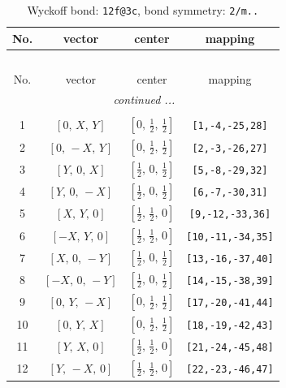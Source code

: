 \documentclass[fleqn,8pt]{jsarticle}
\begin{document}
\renewcommand{\arraystretch}{1.2}
\begin{longtable}{cccc}
\caption{Wyckoff bond: {\tt 12f@3c}, bond symmetry: {\tt 2/m..}}
 \\
 \hline \hline
No. & vector & center & mapping \\ \hline \endfirsthead

\multicolumn{3}{l}{\tablename\ \thetable{}} \\
 \hline \hline
No. & vector & center & mapping \\ \hline \endhead

 \hline \hline
\multicolumn{3}{r}{\footnotesize\it continued ...} \\ \endfoot

 \hline \hline
\multicolumn{3}{r}{} \\ \endlastfoot

1 & $\left[ 0,\, X,\, Y \right]$ & $\left[ 0,\, \frac{1}{2},\, \frac{1}{2} \right]$ & {\tt [1,-4,-25,28]} \\ \hline
2 & $\left[ 0,\, - X,\, Y \right]$ & $\left[ 0,\, \frac{1}{2},\, \frac{1}{2} \right]$ & {\tt [2,-3,-26,27]} \\ \hline
3 & $\left[ Y,\, 0,\, X \right]$ & $\left[ \frac{1}{2},\, 0,\, \frac{1}{2} \right]$ & {\tt [5,-8,-29,32]} \\ \hline
4 & $\left[ Y,\, 0,\, - X \right]$ & $\left[ \frac{1}{2},\, 0,\, \frac{1}{2} \right]$ & {\tt [6,-7,-30,31]} \\ \hline
5 & $\left[ X,\, Y,\, 0 \right]$ & $\left[ \frac{1}{2},\, \frac{1}{2},\, 0 \right]$ & {\tt [9,-12,-33,36]} \\ \hline
6 & $\left[ - X,\, Y,\, 0 \right]$ & $\left[ \frac{1}{2},\, \frac{1}{2},\, 0 \right]$ & {\tt [10,-11,-34,35]} \\ \hline
7 & $\left[ X,\, 0,\, - Y \right]$ & $\left[ \frac{1}{2},\, 0,\, \frac{1}{2} \right]$ & {\tt [13,-16,-37,40]} \\ \hline
8 & $\left[ - X,\, 0,\, - Y \right]$ & $\left[ \frac{1}{2},\, 0,\, \frac{1}{2} \right]$ & {\tt [14,-15,-38,39]} \\ \hline
9 & $\left[ 0,\, Y,\, - X \right]$ & $\left[ 0,\, \frac{1}{2},\, \frac{1}{2} \right]$ & {\tt [17,-20,-41,44]} \\ \hline
10 & $\left[ 0,\, Y,\, X \right]$ & $\left[ 0,\, \frac{1}{2},\, \frac{1}{2} \right]$ & {\tt [18,-19,-42,43]} \\ \hline
11 & $\left[ Y,\, X,\, 0 \right]$ & $\left[ \frac{1}{2},\, \frac{1}{2},\, 0 \right]$ & {\tt [21,-24,-45,48]} \\ \hline
12 & $\left[ Y,\, - X,\, 0 \right]$ & $\left[ \frac{1}{2},\, \frac{1}{2},\, 0 \right]$ & {\tt [22,-23,-46,47]} \\
\end{longtable}
\end{document}
